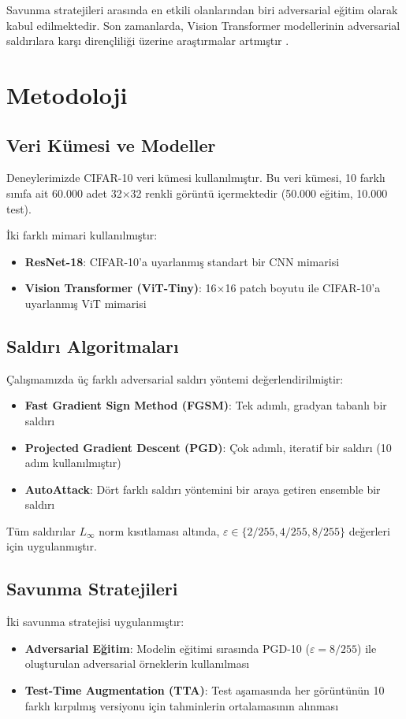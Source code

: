 \documentclass[a4paper,12pt]{article}
\begin{document}
Savunma stratejileri arasında en etkili olanlarından biri adversarial eğitim \cite{madry2018} olarak kabul edilmektedir. Son zamanlarda, Vision Transformer modellerinin adversarial saldırılara karşı dirençliliği üzerine araştırmalar artmıştır \cite{bhojanapalli2021, paul2022, fort2023}.

\section{Metodoloji}

\subsection{Veri Kümesi ve Modeller}
Deneylerimizde CIFAR-10 veri kümesi kullanılmıştır. Bu veri kümesi, 10 farklı sınıfa ait 60.000 adet 32×32 renkli görüntü içermektedir (50.000 eğitim, 10.000 test).

İki farklı mimari kullanılmıştır:
\begin{itemize}
    \item \textbf{ResNet-18}: CIFAR-10'a uyarlanmış standart bir CNN mimarisi
    \item \textbf{Vision Transformer (ViT-Tiny)}: 16×16 patch boyutu ile CIFAR-10'a uyarlanmış ViT mimarisi
\end{itemize}

\subsection{Saldırı Algoritmaları}
Çalışmamızda üç farklı adversarial saldırı yöntemi değerlendirilmiştir:
\begin{itemize}
    \item \textbf{Fast Gradient Sign Method (FGSM)}: Tek adımlı, gradyan tabanlı bir saldırı
    \item \textbf{Projected Gradient Descent (PGD)}: Çok adımlı, iteratif bir saldırı (10 adım kullanılmıştır)
    \item \textbf{AutoAttack}: Dört farklı saldırı yöntemini bir araya getiren ensemble bir saldırı
\end{itemize}

Tüm saldırılar $L_\infty$ norm kısıtlaması altında, $\varepsilon \in \{2/255, 4/255, 8/255\}$ değerleri için uygulanmıştır.

\subsection{Savunma Stratejileri}
İki savunma stratejisi uygulanmıştır:
\begin{itemize}
    \item \textbf{Adversarial Eğitim}: Modelin eğitimi sırasında PGD-10 ($\varepsilon=8/255$) ile oluşturulan adversarial örneklerin kullanılması
    \item \textbf{Test-Time Augmentation (TTA)}: Test aşamasında her görüntünün 10 farklı kırpılmış versiyonu için tahminlerin ortalamasının alınması
\end{itemize}
\end{document}
